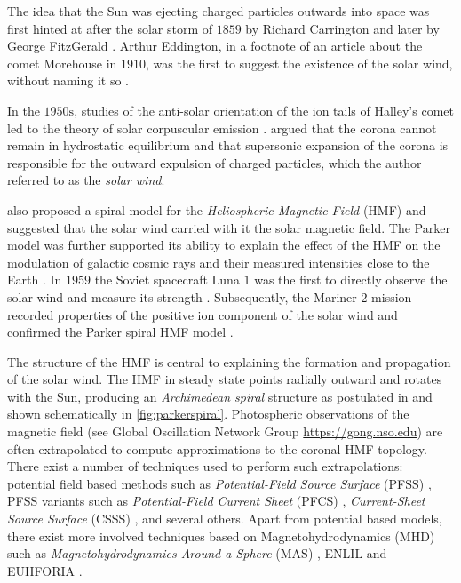 The idea that the Sun was ejecting charged particles outwards into space was first hinted at after 
the solar storm of $1859$ by Richard Carrington \citep{cliver20131859} and later by George 
FitzGerald \citep{meyer2007basics}. Arthur Eddington, in a footnote of an article about the comet 
Morehouse in $1910$, was the first to suggest the existence of the solar wind, without naming it so 
\citep{eddingtonFootnote}.

In the $1950\text{s}$, studies of the anti-solar orientation of the ion tails of Halley's comet 
led to the theory of solar corpuscular emission \citep{Bierman1,Bierman2,Bierman3}. 
\citet{parker1958dynamics,Parker1960,Parker1965} argued that the corona cannot remain in 
hydrostatic equilibrium and that supersonic expansion of the corona is responsible for the 
outward expulsion of charged particles, which the author referred to as the \emph{solar wind}.

\citet{parker1958dynamics} also proposed a spiral model for the \emph{Heliospheric Magnetic Field} 
(HMF) and suggested that the solar wind carried with it the solar magnetic field. The Parker model 
was further supported its ability to explain the effect of the HMF on the modulation of galactic 
cosmic rays and their measured intensities close to the Earth \citep{ParkerSolarWind}. In $1959$ 
the Soviet spacecraft Luna $1$ was the first to directly observe the solar wind and measure its 
strength \citep{harvey2007russian}. Subsequently, the Mariner $2$ mission recorded properties of 
the positive ion component of the solar wind and confirmed the Parker spiral HMF model 
\citep{neugebauer1966mariner}.

The structure of the HMF is central to explaining the formation and propagation of the solar wind. 
The HMF in steady state points radially outward and rotates with the Sun, producing an 
\emph{Archimedean spiral} structure as postulated in \cite{parker1958dynamics} and shown 
schematically in \cref{fig:parkerspiral}. Photospheric observations of the magnetic field (see 
Global Oscillation Network Group \url{https://gong.nso.edu}) are often extrapolated to compute 
approximations to the coronal HMF topology. There exist a number of techniques used to perform such 
extrapolations: potential field based methods such as \emph{Potential-Field Source Surface} (PFSS) 
\citep{schatten1969model,altschuler1969magnetic}, PFSS variants such as 
\emph{Potential-Field Current Sheet} (PFCS) \citep{schatten1971current}, 
\emph{Current-Sheet Source Surface} (CSSS) \citep{csss}, and several others. Apart from potential 
based models, there exist more involved techniques based on Magnetohydrodynamics (MHD) such as 
\emph{Magnetohydrodynamics Around a Sphere} (MAS) \citep{linker1999magnetohydrodynamic}, 
ENLIL \citep{ODSTRCIL1996,ODSTRCIL1999a,ODSTRCIL1999b,ODSTRCIL2003,ODSTRCIL2004} and EUHFORIA 
\citep{pomoell2018euhforia}. 

